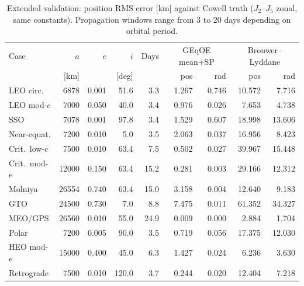 \begin{table}[ht]
\centering
\caption{Extended validation: position RMS error [km] against Cowell truth
($J_2$--$J_5$ zonal, same constants). Propagation windows range from
3 to 20 days depending on orbital period.}
\label{tab:extended_validation}
\small
\begin{tabular}{@{}lrrrrrrrr@{}}
\toprule
Case & $a$ & $e$ & $i$ & Days & \multicolumn{2}{c}{GEqOE mean+SP} & \multicolumn{2}{c}{Brouwer--Lyddane} \\
 & [km] & & [deg] &  & pos & rad & pos & rad \\
\midrule
LEO circ. & 6878 & 0.001 & 51.6 & 3.3 & 1.267 & 0.746 & 10.572 & 7.716 \\
LEO mod-$e$ & 7000 & 0.050 & 40.0 & 3.4 & 0.976 & 0.026 & 7.653 & 4.738 \\
SSO & 7078 & 0.001 & 97.8 & 3.4 & 1.529 & 0.607 & 18.998 & 13.606 \\
Near-equat. & 7200 & 0.010 & 5.0 & 3.5 & 2.063 & 0.037 & 16.956 & 8.423 \\
Crit.\ low-$e$ & 7500 & 0.010 & 63.4 & 7.5 & 0.502 & 0.027 & 39.967 & 15.448 \\
Crit.\ mod-$e$ & 12000 & 0.150 & 63.4 & 15.2 & 0.281 & 0.003 & 29.166 & 12.312 \\
Molniya & 26554 & 0.740 & 63.4 & 15.0 & 3.158 & 0.004 & 12.640 & 9.183 \\
GTO & 24500 & 0.730 & 7.0 & 8.8 & 7.475 & 0.011 & 61.352 & 34.327 \\
MEO/GPS & 26560 & 0.010 & 55.0 & 24.9 & 0.009 & 0.000 & 2.884 & 1.704 \\
Polar & 7200 & 0.005 & 90.0 & 3.5 & 0.719 & 0.056 & 17.375 & 12.030 \\
HEO mod-$e$ & 15000 & 0.400 & 45.0 & 6.3 & 1.427 & 0.024 & 6.236 & 3.630 \\
Retrograde & 7500 & 0.010 & 120.0 & 3.7 & 0.244 & 0.020 & 12.404 & 7.218 \\
\bottomrule
\end{tabular}
\end{table}